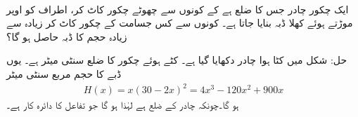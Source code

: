 
\\
 ایک چکور چادر جس کا ضلع  ہے کے کونوں سے چھوٹے چکور کاٹ کر، اطراف کو اوپر موڑتے ہوئے کھلا ڈبہ بنایا جاتا ہے۔ کونوں سے کس جسامت کے چکور کاٹ کر زیادہ سے زیادہ حجم کا ڈبہ حاصل ہو گا؟

حل:\quad
شکل  میں کٹا ہوا چادر دکھایا گیا ہے۔ کٹے ہوئے چکور کا ضلع  سنٹی میٹر ہے۔ یوں ڈبے کا حجم  مربع سنٹی میٹر 
\begin{align*}
H(x)=x(30-2x)^2=4x^3-120x^2+900x
\end{align*}
ہو گا۔چونکہ چادر کے  ضلع  ہے لہٰذا  ہو گا جو تفاعل  کا دائرہ کار ہے۔

